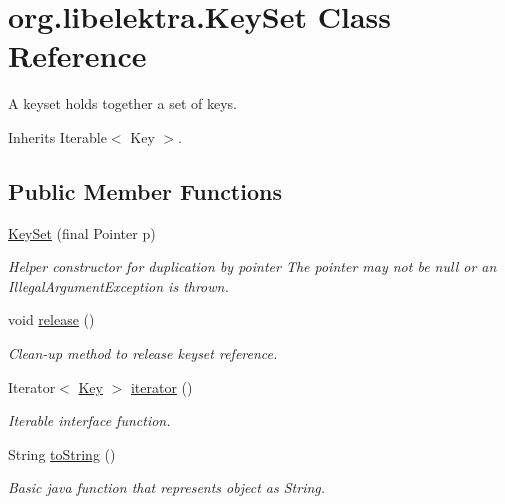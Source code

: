 \hypertarget{classorg_1_1libelektra_1_1KeySet}{}\section{org.\+libelektra.\+Key\+Set Class Reference}
\label{classorg_1_1libelektra_1_1KeySet}


A keyset holds together a set of keys.  




Inherits Iterable$<$ Key $>$.

\subsection*{Public Member Functions}
\begin{DoxyCompactItemize}
\item 
\hyperlink{classorg_1_1libelektra_1_1KeySet_adf4ea02b31ed468e49c615f61ea57a15}{Key\+Set} (final Pointer p)
\begin{DoxyCompactList}\small\item\em Helper constructor for duplication by pointer The pointer may not be null or an Illegal\+Argument\+Exception is thrown. \end{DoxyCompactList}\item 
\mbox{\label{classorg_1_1libelektra_1_1KeySet_aa3851e13c627e32f02275636806e30cc}} 
void \hyperlink{classorg_1_1libelektra_1_1KeySet_aa3851e13c627e32f02275636806e30cc}{release} ()
\begin{DoxyCompactList}\small\item\em Clean-\/up method to release keyset reference. \end{DoxyCompactList}\item 
Iterator$<$ \hyperlink{classorg_1_1libelektra_1_1Key}{Key} $>$ \hyperlink{classorg_1_1libelektra_1_1KeySet_a1a3b37dff55df600c4fee6bea714a8d9}{iterator} ()
\begin{DoxyCompactList}\small\item\em Iterable interface function. \end{DoxyCompactList}\item 
String \hyperlink{classorg_1_1libelektra_1_1KeySet_a9c1e2918acce8c7cda5be406989c87af}{to\+String} ()
\begin{DoxyCompactList}\small\item\em Basic java function that represents object as String. \end{DoxyCompactList}\item 

\end{DoxyCompactItemize}
